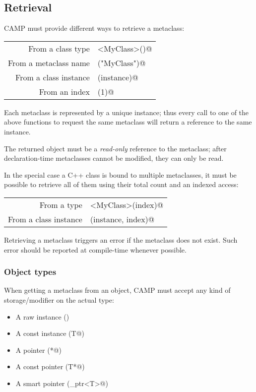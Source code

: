 \documentclass[a4paper, twoside]{report}
\begin{document}
\subsection{Retrieval}

	CAMP must provide different ways to retrieve a metaclass:

	\begin{tabular}{r|l}
		From a class type 		& \verb@classByType<MyClass>()@  \\
		From a metaclass name & \verb@classByName("MyClass")@  \\
		From a class instance &	\verb@classByObject(instance)@ \\
		From an index				  &	\verb@classByIndex(1)@ 				 \\
	\end{tabular}
	
	Each metaclass is represented by a unique instance; thus every call to one of the above functions
	to request the same metaclass will return a reference to the same instance.
	
	The returned object must be a \emph{read-only} reference to the metaclass; after declaration-time
	metaclasses cannot be modified, they can only be read.

	In the special case a C++ class is bound to multiple metaclasses, it must be possible to
	retrieve all of them using their total count and an indexed access:

	\begin{tabular}{r|l}
		From a type 				  & \verb@classByType<MyClass>(index)@    \\
		From a class instance & \verb@classByObject(instance, index)@
	\end{tabular}
	
	Retrieving a metaclass triggers an error if the metaclass does not exist. Such error should be reported
	at compile-time whenever possible.

\subsubsection{Object types}

	When getting a metaclass from an object, CAMP must accept any kind of storage/modifier on the actual type:

	\begin{itemize}
		\item A raw instance (\verb@T@)
		\item A const instance (\verb@const T@)
		\item A pointer (\verb@T*@)
		\item A const pointer (\verb@const T*@)
		\item A smart pointer (\verb@shared_ptr<T>@)
	\end{itemize}
	
\end{document}
